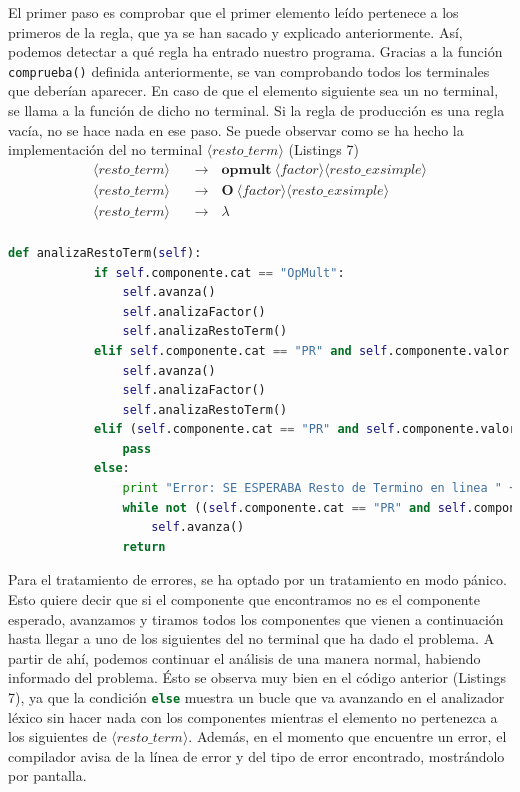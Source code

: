 \documentclass[11pt]{article}
\newcommand{\nt}[1]{\langle#1\rangle}
\newcommand{\regla}[2]{\nt{#1} \ \ \ &\rightarrow \ \ \ #2 \\}
\begin{document}
El primer paso es comprobar que el primer elemento leído pertenece a los primeros de la regla, que ya se han sacado y explicado anteriormente. Así, podemos detectar a qué regla ha entrado nuestro programa. Gracias a la función \lstinline[language=Python]{comprueba()} definida anteriormente, se van comprobando todos los terminales que deberían aparecer. En caso de que el elemento siguiente sea un no terminal, se llama a la función de dicho no terminal. Si la regla de producción es una regla vacía, no se hace nada en ese paso. Se puede observar como se ha hecho la implementación del no terminal $\nt{resto\_term}$ (Listings 7)
\begin{align*}
	\regla{resto\_term}{\textbf{opmult} \ \nt{factor} \nt{resto\_exsimple}}
	\regla{resto\_term}{\textbf{O} \ \nt{factor} \nt{resto\_exsimple}}
	\regla{resto\_term}{\lambda}
\end{align*}

\begin{minipage}{\linewidth}
	\begin{lstlisting}[language=Python, caption=analizaRestoTerm()]
		def analizaRestoTerm(self):
			if self.componente.cat == "OpMult":
				self.avanza()
				self.analizaFactor()
				self.analizaRestoTerm()
			elif self.componente.cat == "PR" and self.componente.valor == "Y":
				self.avanza()
				self.analizaFactor()
				self.analizaRestoTerm()
			elif (self.componente.cat == "PR" and self.componente.valor in ["ENTONCES", "HACER", "SINO", "O"]) or self.componente.cat == "ParentCi" or self.componente.cat == "CorCi" or self.componente.cat == "OpRel" or self.componente.cat == "PtoComa" or self.componente.cat == "OpAdd":
				pass
			else: 
				print "Error: SE ESPERABA Resto de Termino en linea " + str(self.lexico.nlinea)
				while not ((self.componente.cat == "PR" and self.componente.valor in ["O", "ENTONCES", "HACER", "SINO"]) or self.componente.cat == "OpRel" or self.componente.cat == "OpAdd" or self.componente.cat == "CorCi" or self.componente.cat == "ParentCi" or self.componente.cat == "PtoComa"):
					self.avanza()
				return
	\end{lstlisting}
\end{minipage}

Para el tratamiento de errores, se ha optado por un tratamiento en modo pánico. Esto quiere decir que si el componente que encontramos no es el componente esperado, avanzamos y tiramos todos los componentes que vienen a continuación hasta llegar a uno de los siguientes del no terminal que ha dado el problema. A partir de ahí, podemos continuar el análisis de una manera normal, habiendo informado del problema. Ésto se observa muy bien en el código anterior (Listings 7), ya que la condición \lstinline[language=Python]{else} muestra un bucle que va avanzando en el analizador léxico sin hacer nada con los componentes mientras el elemento no pertenezca a los siguientes de $\nt{resto\_term}$. Además, en el momento que encuentre un error, el compilador avisa de la línea de error y del tipo de error encontrado, mostrándolo por pantalla.
\end{document}
